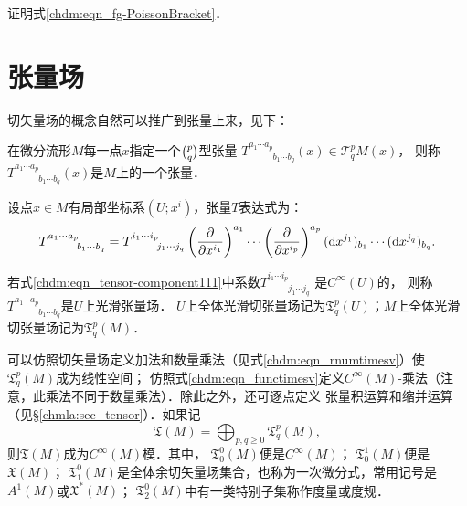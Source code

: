 \begin{exercise}
	证明式\eqref{chdm:eqn_fg-PoissonBracket}．
\end{exercise}

\section{张量场}\label{chdm:sec_tensor-fields}
切矢量场的概念自然可以推广到张量上来，见下：
\begin{definition}\label{chdm:def_tensor-field}
    在微分流形$M$每一点$x$指定一个$\binom{p}{q}$型张量
    $T^{a_1\cdots a_p}_{\phantom{a_1 \cdots a_p}b_1\cdots b_q}(x)\in \mathcal{T}^{p}_{q} M (x)$，
    则称$T^{a_1\cdots a_p}_{\phantom{a_1 \cdots a_p}b_1\cdots b_q}(x)$是$M$上的一个{\heiti 张量}．
\end{definition}
设点$x\in M$有局部坐标系$(U;x^i)$，张量$T$表达式为：
\begin{equation}\label{chdm:eqn_tensor-component111}
    T^{a_1 \cdots a_p}_{\phantom{a_1 \cdots a_p}b_1\cdots b_q} 
    = T^{i_1 \cdots i_p}_{\phantom{i_1 \cdots i_p}j_1\cdots j_q} 
    \left(\frac{\partial }{\partial x^{i_1}}\right)^{a_1} \cdots 
    \left(\frac{\partial }{\partial x^{i_p}}\right)^{a_p} 
    ({\rm d}x^{j_1})_{b_1} \cdots  ({\rm d}x^{j_q})_{b_q}    .
\end{equation}
\begin{definition}
    若式\eqref{chdm:eqn_tensor-component111}中系数$T^{i_1 \cdots i_p}_{\phantom{i_1 \cdots i_p}j_1\cdots j_q}$
    是$C^\infty(U)$的，
    则称$T^{a_1\cdots a_p}_{\phantom{a_1 \cdots a_p}b_1\cdots b_q}$是$U$上{\heiti 光滑张量场}．
    $U$上全体光滑切张量场记为$\mathfrak{T}^p_q(U)$；$M$上全体光滑切张量场记为$\mathfrak{T}^p_q(M)$．
\end{definition}
可以仿照切矢量场定义加法和数量乘法（见式\eqref{chdm:eqn_rnumtimesv}）使$\mathfrak{T}^p_q(M)$成为线性空间；
仿照式\eqref{chdm:eqn_functimesv}定义$C^\infty(M)$-乘法（注意，此乘法不同于数量乘法）．除此之外，还可逐点定义
张量积运算和缩并运算（见\S \ref{chmla:sec_tensor}）．如果记
\begin{equation}
    \mathfrak{T}(M) = \bigoplus_{p,q \geqslant 0} \mathfrak{T}^p_q(M),
\end{equation}
则$\mathfrak{T}(M)$成为$C^\infty(M)$模．其中，
$\mathfrak{T}^{0}_{0}(M)$便是$C^\infty(M)$；
$\mathfrak{T}^{1}_{0}(M)$便是$\mathfrak{X}(M)$；
$\mathfrak{T}^{0}_{1}(M)$是全体余切矢量场集合，也称为{\heiti 一次微分式}，常用记号是${A}^{1}(M)$或$\mathfrak{X}^*(M)$；
$\mathfrak{T}^{0}_{2}(M)$中有一类特别子集称作{\heiti 度量}或{\heiti 度规}．

